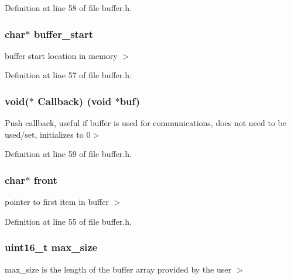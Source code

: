 Definition at line 58 of file buffer.\+h.

\hypertarget{structbuffer__t_af127db1c17ed58547ff5125a912d02b9}{}
\subsubsection[{buffer\+\_\+start}]{\setlength{\rightskip}{0pt plus 5cm}char$\ast$ buffer\+\_\+start}\label{structbuffer__t_af127db1c17ed58547ff5125a912d02b9}
buffer start location in memory $>$ 

Definition at line 57 of file buffer.\+h.

\hypertarget{structbuffer__t_a7957c810329d9c779aad2a456bd77757}{}
\subsubsection[{Callback}]{\setlength{\rightskip}{0pt plus 5cm}void($\ast$ Callback) (void $\ast$buf)}\label{structbuffer__t_a7957c810329d9c779aad2a456bd77757}
Push callback, useful if buffer is used for communications, does not need to be used/set, initializes to 0$>$ 

Definition at line 59 of file buffer.\+h.

\hypertarget{structbuffer__t_a76c4b89775aec874cd21ff80a9c099e1}{}
\subsubsection[{front}]{\setlength{\rightskip}{0pt plus 5cm}char$\ast$ front}\label{structbuffer__t_a76c4b89775aec874cd21ff80a9c099e1}
pointer to first item in buffer $>$ 

Definition at line 55 of file buffer.\+h.

\hypertarget{structbuffer__t_a58516967d6d94fcbcd0b8fc2320e581f}{}
\subsubsection[{max\+\_\+size}]{\setlength{\rightskip}{0pt plus 5cm}uint16\+\_\+t max\+\_\+size}\label{structbuffer__t_a58516967d6d94fcbcd0b8fc2320e581f}
max\+\_\+size is the length of the buffer array provided by the user $>$ 

